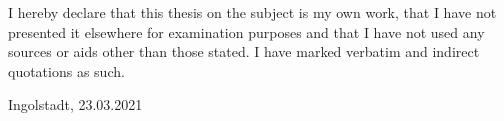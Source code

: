 \thispagestyle{plain}

I hereby declare that this thesis on the subject is my own work, that I have not presented it elsewhere for examination purposes and that I have not used any sources or aids other than those stated. I have marked verbatim and indirect quotations as such.
\vspace{3cm}

Ingolstadt, 23.03.2021
